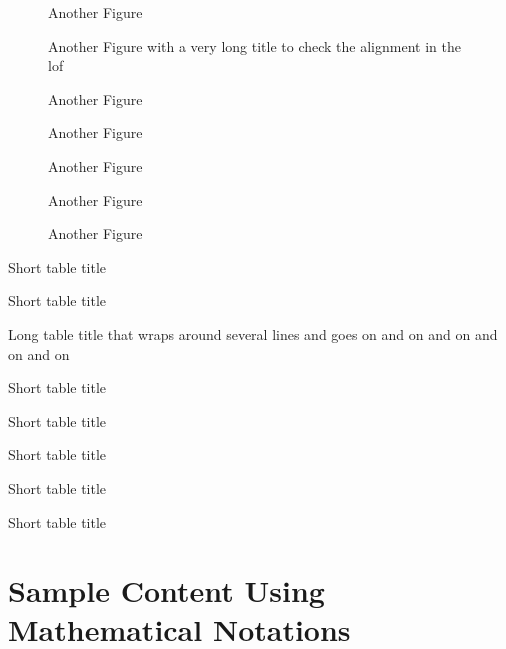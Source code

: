 \begin{figure}%
\caption{Another Figure}%
\end{figure}

\begin{figure}%
\caption{Another Figure with a very long title to check the alignment in the lof}%
\end{figure}

\begin{figure}%
\caption{Another Figure}%
\end{figure}

\begin{figure}%
\caption{Another Figure}%
\end{figure}

\begin{figure}%
\caption{Another Figure}%
\end{figure}

\begin{figure}%
\caption{Another Figure}%
\end{figure}

\begin{figure}%
\caption{Another Figure}%
\end{figure}

\begin{table}
\caption{Short table title}
\end{table}
\begin{table}
\caption{Short table title}
\end{table}
\begin{table}
\caption{Long table title that wraps around several lines and goes on and on and on and on and on}
\end{table}
\begin{table}
\caption{Short table title}
\end{table}
\begin{table}
\caption{Short table title}
\end{table}
\begin{table}
\caption{Short table title}
\end{table}
\begin{table}
\caption{Short table title}
\end{table}
\begin{table}
\caption{Short table title}
\end{table}


\chapter{Sample Content Using Mathematical Notations}

